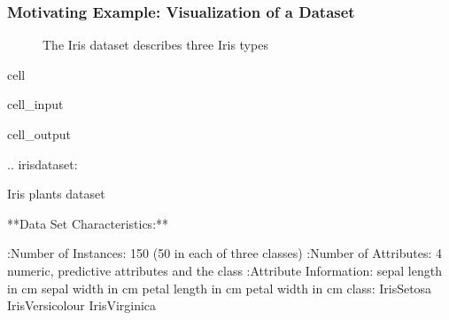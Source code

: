 \documentclass[letterpaper,10pt,english]{jupyterBook}
\let\sphinxpxdimen\pdfpxdimen\else\newdimen\sphinxpxdimen
\begin{document}
\subsubsection{Motivating Example: Visualization of a Dataset}
\label{\detokenize{dim_reduction_pca:motivating-example-visualization-of-a-dataset}}
\begin{figure}[htbp]
\centering
\capstart

\noindent\sphinxincludegraphics[height=300\sphinxpxdimen]{{iris_Pictures}.jpg}
\caption{The Iris dataset describes three Iris types}\label{\detokenize{dim_reduction_pca:iris}}\end{figure}

\begin{sphinxuseclass}{cell}\begin{sphinxVerbatimInput}

\begin{sphinxuseclass}{cell_input}
\begin{sphinxVerbatim}[commandchars=\\\{\}]
   
  
  
  
\end{sphinxVerbatim}

\end{sphinxuseclass}\end{sphinxVerbatimInput}
\begin{sphinxVerbatimOutput}

\begin{sphinxuseclass}{cell_output}
\begin{sphinxVerbatim}[commandchars=\\\{\}]
.. \PYGZus{}iris\PYGZus{}dataset:

Iris plants dataset
\PYGZhy{}\PYGZhy{}\PYGZhy{}\PYGZhy{}\PYGZhy{}\PYGZhy{}\PYGZhy{}\PYGZhy{}\PYGZhy{}\PYGZhy{}\PYGZhy{}\PYGZhy{}\PYGZhy{}\PYGZhy{}\PYGZhy{}\PYGZhy{}\PYGZhy{}\PYGZhy{}\PYGZhy{}\PYGZhy{}

**Data Set Characteristics:**

    :Number of Instances: 150 (50 in each of three classes)
    :Number of Attributes: 4 numeric, predictive attributes and the class
    :Attribute Information:
        \PYGZhy{} sepal length in cm
        \PYGZhy{} sepal width in cm
        \PYGZhy{} petal length in cm
        \PYGZhy{} petal width in cm
        \PYGZhy{} class:
                \PYGZhy{} Iris\PYGZhy{}Setosa
                \PYGZhy{} Iris\PYGZhy{}Versicolour
                \PYGZhy{} Iris\PYGZhy{}Virginica
                

\end{sphinxVerbatim}
\end{sphinxuseclass}
\end{sphinxVerbatimOutput}
\end{sphinxuseclass}
\end{document}
